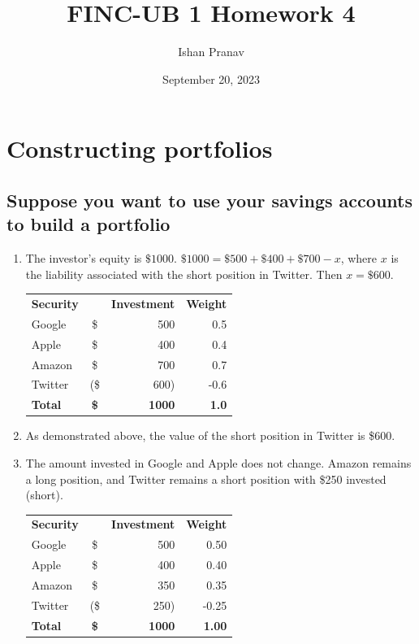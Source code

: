 \documentclass[12pt]{article}
\title{FINC-UB 1 Homework 4}
\author{Ishan Pranav}
\date{September 20, 2023}
\begin{document}
\maketitle
\section{Constructing portfolios}
\subsection{Suppose you want to use your savings accounts to build a portfolio}
\begin{enumerate}
\item The investor's equity is $\$1000$. $\$1000=\$500+\$400+\$700-x$, where $x$ is the liability associated with the short position in Twitter. Then $x=\$600$.
\begin{center}
\begin{tabular}{l|cr|r}
\textbf{Security}&&\textbf{Investment}&\textbf{Weight}\\
Google&\$&500&0.5\\
Apple&\$&400&0.4\\
Amazon&\$&700&0.7\\
Twitter&(\$&600)&-0.6\\
\textbf{Total}&\textbf{\$}&\textbf{1000}&\textbf{1.0}\\
\end{tabular}
\end{center}
\item As demonstrated above, the value of the short position in Twitter is \$600.
\item The amount invested in Google and Apple does not change. Amazon remains a long position, and Twitter remains a short position with \$250 invested (short).
\begin{center}
\begin{tabular}{l|cr|r}
\textbf{Security}&&\textbf{Investment}&\textbf{Weight}\\
Google&\$&500&0.50\\
Apple&\$&400&0.40\\
Amazon&\$&350&0.35\\
Twitter&(\$&250)&-0.25\\
\textbf{Total}&\textbf{\$}&\textbf{1000}&\textbf{1.00}\\
\end{tabular}
\end{center}
\end{enumerate}
\end{document}
